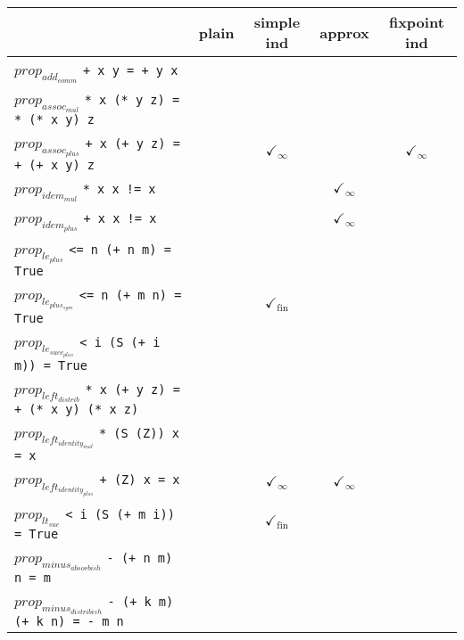 \documentclass{article}
\begin{document}
\begin{longtable}{p{10cm} || c | c | c | c | }
  & plain & simple ind & approx & fixpoint ind \\
\hline
$prop_{add_{comm}}$ \newline \verb`+ x y = + y x` &  &  &  &  \\
\hline
$prop_{assoc_{mul}}$ \newline \verb`* x (* y z) = * (* x y) z` &  &  &  &  \\
\hline
$prop_{assoc_{plus}}$ \newline \verb`+ x (+ y z) = + (+ x y) z` &  & $\checkmark_{\infty}$ &  & $\checkmark_{\infty}$ \\
\hline
$prop_{idem_{mul}}$ \newline \verb`* x x != x` &  &  & $\checkmark_{\infty}$ &  \\
\hline
$prop_{idem_{plus}}$ \newline \verb`+ x x != x` &  &  & $\checkmark_{\infty}$ &  \\
\hline
$prop_{le_{plus}}$ \newline \verb`<= n (+ n m) = True` &  &  &  &  \\
\hline
$prop_{le_{plus_{sym}}}$ \newline \verb`<= n (+ m n) = True` &  & $\checkmark_{\mathrm{fin}}$ &  &  \\
\hline
$prop_{le_{succ_{plus}}}$ \newline \verb`< i (S (+ i m)) = True` &  &  &  &  \\
\hline
$prop_{left_{distrib}}$ \newline \verb`* x (+ y z) = + (* x y) (* x z)` &  &  &  &  \\
\hline
$prop_{left_{identity_{mul}}}$ \newline \verb`* (S (Z)) x = x` &  &  &  &  \\
\hline
$prop_{left_{identity_{plus}}}$ \newline \verb`+ (Z) x = x` &  & $\checkmark_{\infty}$ & $\checkmark_{\infty}$ &  \\
\hline
$prop_{lt_{suc}}$ \newline \verb`< i (S (+ m i)) = True` &  & $\checkmark_{\mathrm{fin}}$ &  &  \\
\hline
$prop_{minus_{absorbish}}$ \newline \verb`- (+ n m) n = m` &  &  &  &  \\
\hline
$prop_{minus_{distribish}}$ \newline \verb`- (+ k m) (+ k n) = - m n` &  &  &  &  \\

\end{longtable}
\end{document}
